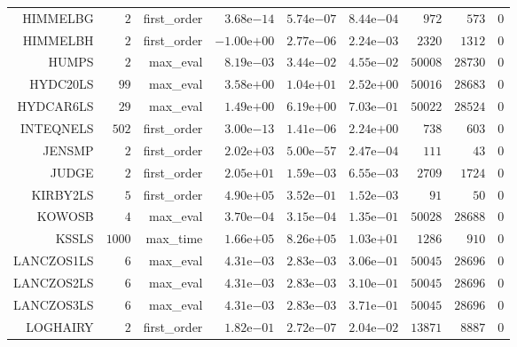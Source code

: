 \begin{longtable}{rrrrrrrrr}
HIMMELBG & \(     2\) & first\_order & \( 3.68\)e\(-14\) & \( 5.74\)e\(-07\) & \( 8.44\)e\(-04\) & \(   972\) & \(   573\) & \(     0\) \\
HIMMELBH & \(     2\) & first\_order & \(-1.00\)e\(+00\) & \( 2.77\)e\(-06\) & \( 2.24\)e\(-03\) & \(  2320\) & \(  1312\) & \(     0\) \\
HUMPS & \(     2\) & max\_eval & \( 8.19\)e\(-03\) & \( 3.44\)e\(-02\) & \( 4.55\)e\(-02\) & \( 50008\) & \( 28730\) & \(     0\) \\
HYDC20LS & \(    99\) & max\_eval & \( 3.58\)e\(+00\) & \( 1.04\)e\(+01\) & \( 2.52\)e\(+00\) & \( 50016\) & \( 28683\) & \(     0\) \\
HYDCAR6LS & \(    29\) & max\_eval & \( 1.49\)e\(+00\) & \( 6.19\)e\(+00\) & \( 7.03\)e\(-01\) & \( 50022\) & \( 28524\) & \(     0\) \\
INTEQNELS & \(   502\) & first\_order & \( 3.00\)e\(-13\) & \( 1.41\)e\(-06\) & \( 2.24\)e\(+00\) & \(   738\) & \(   603\) & \(     0\) \\
JENSMP & \(     2\) & first\_order & \( 2.02\)e\(+03\) & \( 5.00\)e\(-57\) & \( 2.47\)e\(-04\) & \(   111\) & \(    43\) & \(     0\) \\
JUDGE & \(     2\) & first\_order & \( 2.05\)e\(+01\) & \( 1.59\)e\(-03\) & \( 6.55\)e\(-03\) & \(  2709\) & \(  1724\) & \(     0\) \\
KIRBY2LS & \(     5\) & first\_order & \( 4.90\)e\(+05\) & \( 3.52\)e\(-01\) & \( 1.52\)e\(-03\) & \(    91\) & \(    50\) & \(     0\) \\
KOWOSB & \(     4\) & max\_eval & \( 3.70\)e\(-04\) & \( 3.15\)e\(-04\) & \( 1.35\)e\(-01\) & \( 50028\) & \( 28688\) & \(     0\) \\
KSSLS & \(  1000\) & max\_time & \( 1.66\)e\(+05\) & \( 8.26\)e\(+05\) & \( 1.03\)e\(+01\) & \(  1286\) & \(   910\) & \(     0\) \\
LANCZOS1LS & \(     6\) & max\_eval & \( 4.31\)e\(-03\) & \( 2.83\)e\(-03\) & \( 3.06\)e\(-01\) & \( 50045\) & \( 28696\) & \(     0\) \\
LANCZOS2LS & \(     6\) & max\_eval & \( 4.31\)e\(-03\) & \( 2.83\)e\(-03\) & \( 3.10\)e\(-01\) & \( 50045\) & \( 28696\) & \(     0\) \\
LANCZOS3LS & \(     6\) & max\_eval & \( 4.31\)e\(-03\) & \( 2.83\)e\(-03\) & \( 3.71\)e\(-01\) & \( 50045\) & \( 28696\) & \(     0\) \\
LOGHAIRY & \(     2\) & first\_order & \( 1.82\)e\(-01\) & \( 2.72\)e\(-07\) & \( 2.04\)e\(-02\) & \( 13871\) & \(  8887\) & \(     0\) \\

\end{longtable}
